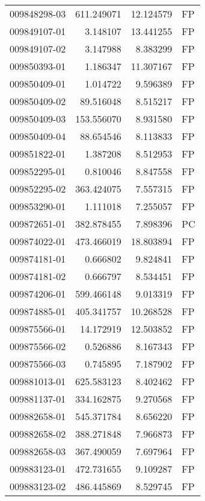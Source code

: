 \begin{tabular}{lrrl}
009848298-03 &  611.249071 &      12.124579 &   FP \\
009849107-01 &    3.148107 &      13.441255 &   FP \\
009849107-02 &    3.147988 &       8.383299 &   FP \\
009850393-01 &    1.186347 &      11.307167 &   FP \\
009850409-01 &    1.014722 &       9.596389 &   FP \\
009850409-02 &   89.516048 &       8.515217 &   FP \\
009850409-03 &  153.556070 &       8.931580 &   FP \\
009850409-04 &   88.654546 &       8.113833 &   FP \\
009851822-01 &    1.387208 &       8.512953 &   FP \\
009852295-01 &    0.810046 &       8.847558 &   FP \\
009852295-02 &  363.424075 &       7.557315 &   FP \\
009853290-01 &    1.111018 &       7.255057 &   FP \\
009872651-01 &  382.878455 &       7.898396 &   PC \\
009874022-01 &  473.466019 &      18.803894 &   FP \\
009874181-01 &    0.666802 &       9.824841 &   FP \\
009874181-02 &    0.666797 &       8.534451 &   FP \\
009874206-01 &  599.466148 &       9.013319 &   FP \\
009874885-01 &  405.341757 &      10.268528 &   FP \\
009875566-01 &   14.172919 &      12.503852 &   FP \\
009875566-02 &    0.526886 &       8.167343 &   FP \\
009875566-03 &    0.745895 &       7.187902 &   FP \\
009881013-01 &  625.583123 &       8.402462 &   FP \\
009881137-01 &  334.162875 &       9.270568 &   FP \\
009882658-01 &  545.371784 &       8.656220 &   FP \\
009882658-02 &  388.271848 &       7.966873 &   FP \\
009882658-03 &  367.490059 &       7.697964 &   FP \\
009883123-01 &  472.731655 &       9.109287 &   FP \\
009883123-02 &  486.445869 &       8.529745 &   FP \\

\end{tabular}
